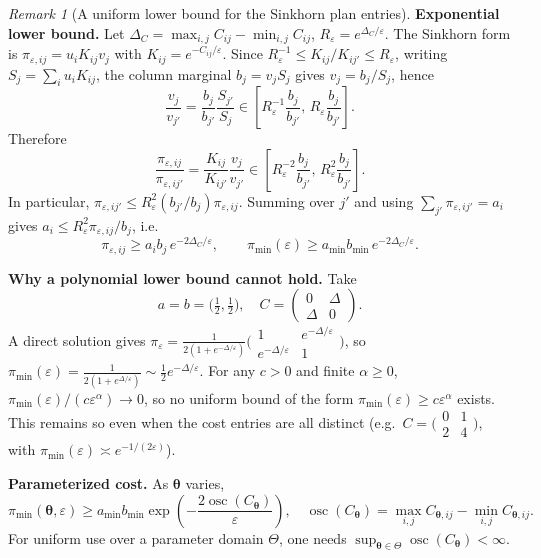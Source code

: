 \documentclass[11pt,a4paper]{article}
\theoremstyle{remark}
\newtheorem{remark}[theorem]{Remark}
\begin{document}
\begin{remark}[A uniform lower bound for the Sinkhorn plan entries]
\medskip
\noindent\textbf{Exponential lower bound.} Let
$\Delta_C=\max_{i,j}C_{ij}-\min_{i,j}C_{ij}$, $R_\varepsilon=e^{\Delta_C/\varepsilon}$.
The Sinkhorn form is $\pi_{\varepsilon,ij}=u_iK_{ij}v_j$ with
$K_{ij}=e^{-C_{ij}/\varepsilon}$. Since $R_\varepsilon^{-1}\le K_{ij}/K_{ij'}\le R_\varepsilon$,
writing $S_j=\sum_i u_iK_{ij}$, the column marginal $b_j=v_jS_j$ gives $v_j=b_j/S_j$, hence
\[
\frac{v_j}{v_{j'}} = \frac{b_j}{b_{j'}}\frac{S_{j'}}{S_j}\in\left[R_\varepsilon^{-1}\frac{b_j}{b_{j'}},\,R_\varepsilon\frac{b_j}{b_{j'}}\right].
\]
Therefore
\[
\frac{\pi_{\varepsilon,ij}}{\pi_{\varepsilon,ij'}} = \frac{K_{ij}}{K_{ij'}}\frac{v_j}{v_{j'}} \in\left[R_\varepsilon^{-2}\frac{b_j}{b_{j'}},\,R_\varepsilon^{2}\frac{b_j}{b_{j'}}\right].
\]
In particular, $\pi_{\varepsilon,ij'}\le R_\varepsilon^{2}(b_{j'}/b_j)\pi_{\varepsilon,ij}$.
Summing over $j'$ and using $\sum_{j'}\pi_{\varepsilon,ij'}=a_i$ gives
$a_i\le R_\varepsilon^{2}\pi_{\varepsilon,ij}/b_j$, i.e.
\[
\boxed{\pi_{\varepsilon,ij}\ge a_i b_j\,e^{-2\Delta_C/\varepsilon}},\qquad
\boxed{\pi_{\min}(\varepsilon)\ge a_{\min}b_{\min}\,e^{-2\Delta_C/\varepsilon}}.
\]

\medskip
\noindent\textbf{Why a polynomial lower bound cannot hold.} Take
\[
a=b=\bigl(\tfrac12,\tfrac12\bigr),\quad
C=\begin{pmatrix}0&\Delta\\\Delta&0\end{pmatrix}.
\]
A direct solution gives
$\pi_\varepsilon=\frac1{2(1+e^{-\Delta/\varepsilon})}\bigl(\begin{smallmatrix}1&e^{-\Delta/\varepsilon}\\e^{-\Delta/\varepsilon}&1\end{smallmatrix}\bigr)$,
so $\pi_{\min}(\varepsilon)=\frac1{2(1+e^{\Delta/\varepsilon})}\sim\frac12e^{-\Delta/\varepsilon}$.
For any $c>0$ and finite $\alpha\ge0$,
$\pi_{\min}(\varepsilon)/(c\varepsilon^\alpha)\to0$, so no uniform bound of the form
$\pi_{\min}(\varepsilon)\ge c\varepsilon^\alpha$ exists. This remains so even when the cost
entries are all distinct (e.g.\
$C=\bigl(\begin{smallmatrix}0&1\\2&4\end{smallmatrix}\bigr)$, with
$\pi_{\min}(\varepsilon)\asymp e^{-1/(2\varepsilon)}$).

\medskip
\noindent\textbf{Parameterized cost.} As $\bm{\theta}$ varies,
\[
\pi_{\min}(\bm{\theta},\varepsilon)\ge a_{\min}b_{\min}\exp\!\left(-\frac{2\operatorname{osc}(C_{\bm{\theta}})}{\varepsilon}\right),\quad
\operatorname{osc}(C_{\bm{\theta}})=\max_{i,j}C_{\bm{\theta},ij}-\min_{i,j}C_{\bm{\theta},ij}.
\]
For uniform use over a parameter domain $\Theta$, one needs
$\sup_{\bm{\theta}\in\Theta}\operatorname{osc}(C_{\bm{\theta}})<\infty$.


\end{remark}
\end{document}
